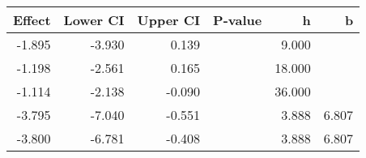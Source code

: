 \begin{table}[ht]
\centering
\begin{tabular}{rrrrrr}
  \hline
Effect & Lower CI & Upper CI & P-value & h & b \\ 
  \hline
-1.895 & -3.930 & 0.139 &  & 9.000 &  \\ 
  -1.198 & -2.561 & 0.165 &  & 18.000 &  \\ 
  -1.114 & -2.138 & -0.090 &  & 36.000 &  \\ 
  -3.795 & -7.040 & -0.551 &  & 3.888 & 6.807 \\ 
  -3.800 & -6.781 & -0.408 &  & 3.888 & 6.807 \\ 
   \hline
\end{tabular}
\end{table}
